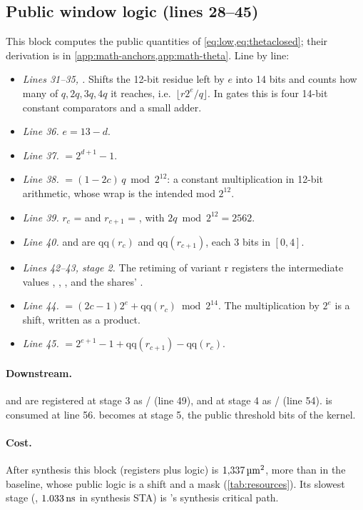 \subsection{Public window logic (lines 28--45)}\label{app:v-public}

This block computes the public quantities of \cref{eq:low,eq:thetaclosed}; their derivation is in \cref{app:math-anchors,app:math-theta}. Line by line:
\begin{itemize}
  \item \emph{Lines 31--35, .} Shifts the 12-bit residue left by $e$ into 14 bits and counts how many of $q, 2q, 3q, 4q$ it reaches, i.e.\ $\lfloor r 2^e/q \rfloor$. In gates this is four 14-bit constant comparators and a small adder.
  \item \emph{Line 36.} $e = 13 - d$.
  \item \emph{Line 37.}  $= 2^{d+1} - 1$.
  \item \emph{Line 38.}  $= (1 - 2c)\,q \bmod 2^{12}$: a constant multiplication in 12-bit arithmetic, whose wrap is the intended mod $2^{12}$.
  \item \emph{Line 39.} $r_c$ =  and $r_{c+1}$ = , with $2q \bmod 2^{12} = 2562$.
  \item \emph{Line 40.}  and  are $\mathrm{qq}(r_c)$ and $\mathrm{qq}(r_{c+1})$, each 3 bits in $[0, 4]$.
  \item \emph{Lines 42--43, stage 2.} The retiming of variant r registers the intermediate values , , ,  and the shares' .
  \item \emph{Line 44.}  $= (2c - 1)2^e + \mathrm{qq}(r_c) \bmod 2^{14}$. The multiplication by $2^e$ is a shift, written as a product.
  \item \emph{Line 45.}  $= 2^{e+1} - 1 + \mathrm{qq}(r_{c+1}) - \mathrm{qq}(r_c)$.
\end{itemize}

\paragraph{Downstream.}  and  are registered at stage 3 as / (line 49), and at stage 4 as / (line 54).  is consumed at line 56.  becomes  at stage 5, the public threshold bits of the kernel.

\paragraph{Cost.} After synthesis this block (registers plus logic) is $1{,}337\,\si{\micro\meter\squared}$, more than in the baseline, whose public logic is a shift and a mask (\cref{tab:resources}). Its slowest stage (, $1.033\,\si{\nano\second}$ in synthesis STA) is \PAMS{}'s synthesis critical path.

